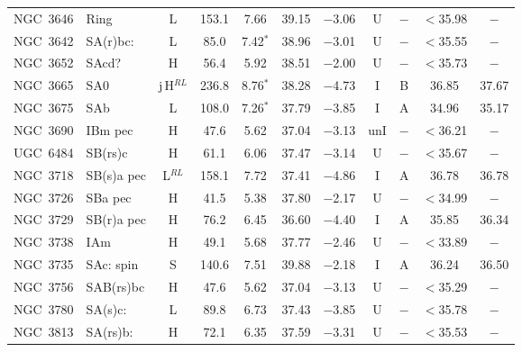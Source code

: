 \begin{center}
\begin{longtable}{lC{2.5cm}ccccccccc}
NGC~3646 & Ring            & L               & 153.1 & 7.66             & 39.15    & $-$3.06   &    U   & $-$       & $<$35.98 & $-$       \\
NGC~3642 & SA(r)bc:        & L          & 85.0    & 7.42$^{*}$       & 38.96    & $-$3.01      &    U   & $-$        & $<$35.55 & $-$      \\
NGC~3652  & SAcd?         &  H         &   56.4   &  5.92          &  38.51    & $-$2.00      &    U  &   $-$      & $<$35.73 & $-$  \\ 
NGC~3665  & SA0            &  j\,H$^{RL}$         &   236.8  &  8.76$^{*}$   &  38.28  &  $-$4.73    &   I    & B  &    36.85   &  37.67 \\
NGC~3675  & SAb             &  L        &  108.0       &  7.26$^{*}$   &  37.79  &  $-$3.85  &  I    & A   &   34.96    &  35.17   \\
NGC~3690 & IBm pec       & H                & 47.6  & 5.62            & 37.04    & $-$3.13  &    unI &$-$       &  $<$36.21 & $-$          \\
UGC~6484 & SB(rs)c         & H               & 61.1  & 6.06             & 37.47    & $-$3.14   &   U   &$-$       & $<$35.67 & $-$       \\
NGC~3718 & SB(s)a pec    & L$^{RL}$         & 158.1 & 7.72             & 37.41    & $-$4.86 &    I   & A        & 36.78    &  36.78        \\
NGC~3726  & SBa pec       & H       &  41.5    &   5.38         &  37.80    & $-$2.17   &  U &   $-$      & $<$34.99 & $-$  \\
NGC~3729  & SB(r)a pec   & H                & 76.2  & 6.45             & 36.60    & $-$4.40 &      I   & A        & 35.85   &  36.34       \\
NGC~3738  & IAm            & H                & 49.1  & 5.68            & 37.77    & $-$2.46  &       U   &$-$       & $<$33.89 & $-$        \\
NGC~3735  & SAc: spin    & S                & 140.6 & 7.51            & 39.88    & $-$2.18  &      I   & A        & 36.24    & 36.50    \\
NGC~3756  & SAB(rs)bc   & H                & 47.6  & 5.62            & 37.04    & $-$3.13  &      U   &$-$       & $<$35.29  & $-$       \\
NGC~3780  & SA(s)c:     & L                & 89.8  & 6.73            & 37.43    & $-$3.85  &      U   &$-$       & $<$35.78  &  $-$         \\
NGC~3813   & SA(rs)b:    & H                & 72.1  & 6.35            &  37.59    & $-$3.31  &   U   &$-$       & $<$35.53 & $-$       \\

\end{longtable}
\end{center}
